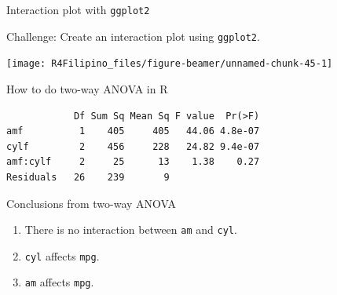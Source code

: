 \begin{frame}[fragile]{Interaction plot with \texttt{ggplot2}}

Challenge: Create an interaction plot using \texttt{ggplot2}.

\begin{center}\texttt{[image: R4Filipino\_files/figure-beamer/unnamed-chunk-45-1]} \end{center}

\end{frame}

\begin{frame}[fragile]{How to do two-way ANOVA in R}

\begin{Shaded}
\begin{Highlighting}[]
\StringTok{ }\OperatorTok{~}\StringTok{ }\OperatorTok{*}\StringTok{ }
\end{Highlighting}
\end{Shaded}

\begin{verbatim}
            Df Sum Sq Mean Sq F value  Pr(>F)
amf          1    405     405   44.06 4.8e-07
cylf         2    456     228   24.82 9.4e-07
amf:cylf     2     25      13    1.38    0.27
Residuals   26    239       9                
\end{verbatim}

\end{frame}

\begin{frame}[fragile]{Conclusions from two-way ANOVA}

\begin{enumerate}
\def\labelenumi{\arabic{enumi}.}
\tightlist
\item
  There is no interaction between \texttt{am} and \texttt{cyl}.
\item
  \texttt{cyl} affects \texttt{mpg}.
\item
  \texttt{am} affects \texttt{mpg}.
\end{enumerate}

\end{frame}


